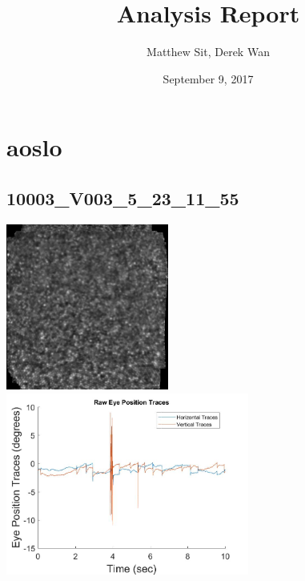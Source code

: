 \documentclass[11pt]{article}
\begin{document}
\title{Analysis Report}
\author{Matthew Sit, Derek Wan}
\date{September 9, 2017}
\maketitle

\section{aoslo}

\subsection{10003\_V003\_5\_23\_11\_55}
\includegraphics[width=0.40\textwidth, valign=m]{referenceframes/aoslo/10003_V003_5_23_11_55_dwt_nostim_gamscaled_bandfilt_refframe.jpg}
\includegraphics[width=0.60\textwidth, valign=m]{eyepositiontraces/aoslo/10003_V003_5_23_11_55.jpg}\\
\end{document}
